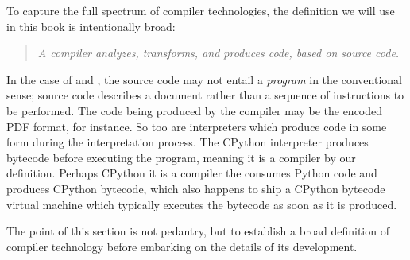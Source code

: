 \vspace{0.5em}

To capture the full spectrum of compiler technologies,
the definition we will use in this book is intentionally broad:
\begin{quotation}
\textit{
    A compiler analyzes, transforms, and produces code, based on source code.
}
\end{quotation}

In the case of \tex and \metafont, the source code
may not entail a \textit{program} in the conventional sense;
\tex source code describes a document rather than a sequence of
instructions to be performed.
The code being produced by the compiler may be the encoded PDF format, for instance.
So too are interpreters which produce code in some form during the interpretation process.
The CPython interpreter produces bytecode before executing the program,
meaning it is a compiler by our definition.
Perhaps CPython it is a compiler the consumes Python code and produces CPython bytecode,
which also happens to ship a CPython bytecode virtual machine which typically
executes the bytecode as soon as it is produced.

The point of this section is not pedantry, but to establish a broad definition of
compiler technology before embarking on the details of its development.
